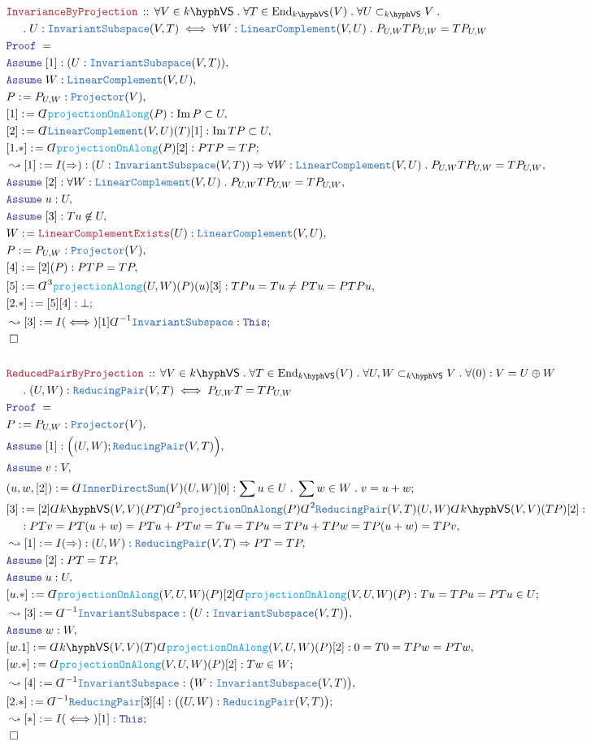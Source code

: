 \documentclass[12pt]{scrartcl}%
\newcommand{\TYPE}[1]{\textcolor{NavyBlue}{\mathtt{#1}}}%
\newcommand{\FUNC}[1]{\textcolor{Cerulean}{\mathtt{#1}}}%
\newcommand{\LOGIC}[1]{\textcolor{Blue}{\mathtt{#1}}}%
\newcommand{\THM}[1]{\textcolor{Maroon}{\mathtt{#1}}}%
\renewcommand{\.}{\; . \;} %
\newcommand{\de}{: \kern 0.1pc =} %
\newcommand{\Theorem}[2]{& \THM{#1} \, :: \, #2 \\ & \Proof = \\ } %
\newcommand{\NewLine}{\\ & \kern 1pc}%
\newcommand{\Page}[1]{ \begin{align*} #1 \end{align*}  }%
\newcommand{ \bd }{ \ByDef }%
\DeclareMathOperator*{\im}{Im}%
\newcommand{\End}{\mathrm{End}}%
\newcommand{\Say}[3]{& #1 \de #2 : #3, \\} %
\newcommand{\Conclude}[3]{& #1 \de #2 : #3; \\}%
\newcommand{\Derive}[3]{& \leadsto #1 \de #2 : #3, \\} %
\newcommand{\DeriveConclude}[3]{& \leadsto #1 \de #2 : #3 ; \\} %
\newcommand{\Assume}[2]{& \LOGIC{Assume} \; #1 : #2, \\} %
\newcommand{\QED}{\; \square} %
\newcommand{\EndProof}{& \QED \\} %
\newcommand{\ByDef}{\rotatebox[origin=c]{-180}{$D$}}%
\newcommand{\Proof}{\LOGIC{Proof} \; } %
\newcommand{\subvec}[1]{\subset_{\VS{#1}}}%
\newcommand{\LC}{\TYPE{LinearComplement}}
\newcommand{\IS}{\TYPE{InvariantSubspace}}
\newcommand{\RP}{\TYPE{ReducingPair}}
\newcommand{\VS}[1]{#1\hyph\mathsf{VS}} %
\begin{document}
\Page{
	\Theorem{InvarianceByProjection}{\forall V \in \VS{k} \. \forall T \in \End_{\VS{k}}(V) \. \forall U \subvec{k} V \.
		\NewLine \. U : \IS(V,T) \iff \forall W : \TYPE{LinearComplement}(V,U) \. P_{U,W}TP_{U,W} = TP_{U,W}}
	\Assume{[1]}{(U : \IS(V,T))}
	\Assume{W}{\LC(V,U)}
	\Say{P}{P_{U,W}}{\TYPE{Projector}(V)}
	\Say{[1]}{\bd \FUNC{projectionOnAlong}(P)}{\im P \subset U}
	\Say{[2]}{\bd \LC(V,U)(T)[1]}{\im TP \subset U}
	\Conclude{[1.*]}{\bd \FUNC{projectionOnAlong}(P)[2]}{PTP = TP}
	\Derive{[1]}{I(\Rightarrow)}{(U : \IS(V,T)) \Rightarrow \forall W : \TYPE{LinearComplement}(V,U) \. P_{U,W}TP_{U,W} = TP_{U,W}}
	\Assume{[2]}{\forall W : \TYPE{LinearComplement}(V,U) \. P_{U,W}TP_{U,W} = TP_{U,W}}
	\Assume{u}{U}
	\Assume{[3]}{Tu \not \in U}
	\Say{W}{\THM{LinearComplementExists}(U)}{\LC(V,U)}
	\Say{P}{P_{U,W}}{\TYPE{Projector}(V)}
	\Say{[4]}{[2](P)}{ PTP = TP}
	\Say{[5]}{\bd^3 \FUNC{projectionAlong}(U,W)(P)(u)[3] }{   TPu = Tu \neq PTu = PTPu  }
	\Conclude{[2.*]}{[5][4]}{\bot}
	\DeriveConclude{[3]}{I(\iff)[1]\bd^{-1}\IS}{\LOGIC{This}}
	\EndProof
	\\
	\Theorem{ReducedPairByProjection}{\forall V \in \VS{k} \. \forall T \in \End_{\VS{k}}(V) \. \forall U,W \subvec{k} V \. \forall (0) : V = U \oplus W
		\NewLine \. (U,W) : \RP(V,T) \iff   P_{U,W}T = TP_{U,W}}
	\Say{P}{P_{U,W}}{\TYPE{Projector}(V)}	
	\Assume{[1]}{\Big((U,W) ; \RP(V,T)\Big)}
	\Assume{v}{V}
	\Conclude{(u,w,[2])}{\bd \TYPE{InnerDirectSum}(V)(U,W)[0]}{\sum u \in U \. \sum w \in W \. v = u + w}
	\Say{[3]}{ [2]\bd \VS{k}(V,V)(PT)\bd^2 \TYPE{projectionOnAlong}(P) \bd^2 \RP(V,T)(U,W)\bd \VS{k}(V,V)(TP)[2] }
	{ \NewLine : PTv = PT(u + w) = PTu + PTw = Tu = TPu = TPu + TPw = TP(u + w)  =TPv   }
	\Derive{[1]}{I(\Rightarrow)}{(U,W) : \RP(V,T) \Rightarrow PT = TP}
	\Assume{[2]}{PT = TP}
	\Assume{u}{U}
	\Conclude{[u.*]}{\bd\FUNC{projectionOnAlong}(V,U,W)(P)[2]\bd\FUNC{projectionOnAlong}(V,U,W)(P)}{  Tu  = TPu  = PTu \in U}
	\Derive{[3]}{\bd^{-1}\IS}{\big(U : \IS(V,T)\big)}
	\Assume{w}{W}
	\Say{[w.1]}{\bd \VS{k}(V,V)(T)\bd \FUNC{projectionOnAlong}(V,U,W)(P)[2]}{ 0 = T0 = TPw = PTw}
	\Conclude{[w.*]}{\bd \FUNC{projectionOnAlong}(V,U,W)(P)[2]}{Tw \in W}
	\Derive{[4]}{\bd^{-1}\IS}{\big(W : \IS(V,T)\big)}
	\Conclude{[2.*]}{\bd^{-1}\RP[3][4]}{\big( (U,W) : \RP(V,T) \big)}
	\DeriveConclude{[*]}{I(\iff)[1]}{\LOGIC{This}}
	\EndProof
}
\end{document}
